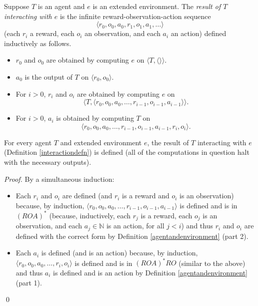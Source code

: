 \documentclass[runningheads]{llncs}
\begin{document}
\begin{definition}
\label{interactiondefn}
    Suppose $T$ is an agent and $e$ is an extended environment.
    The \emph{result of $T$ interacting with $e$} is the infinite
    reward-observation-action sequence
    \[\langle r_0,o_0,a_0,r_1,o_1,a_1,\ldots\rangle\]
    (each $r_i$ a reward, each $o_i$ an observation, and each $a_i$ an action)
    defined inductively as follows.
    \begin{itemize}
        \item $r_0$ and $o_0$ are obtained by computing $e$ on
        $\langle T,\langle\rangle\rangle$.
        \item $a_0$ is the output of $T$ on $\langle r_0,o_0\rangle$.
        \item For $i>0$, $r_i$ and $o_i$ are obtained by computing $e$
        on
        \[\langle T,\langle r_0,o_0,a_0,\ldots,r_{i-1},o_{i-1},a_{i-1}\rangle\rangle.\]
        \item For $i>0$, $a_i$ is obtained by computing $T$ on
        \[\langle r_0,o_0,a_0,\ldots,r_{i-1},o_{i-1},a_{i-1},r_i,o_i\rangle.\]
    \end{itemize}
\end{definition}

\begin{lemma}
    For every agent $T$ and extended environment $e$, the result of $T$ interacting
    with $e$ (Definition \ref{interactiondefn}) is defined (all of the computations
    in question halt with the necessary outputs).
\end{lemma}

\begin{proof}
    By a simultaneous induction:
    \begin{itemize}
        \item
        Each $r_i$ and $o_i$ are defined (and $r_i$ is a reward
        and $o_i$ is an observation) because, by induction,
        $\langle r_0,o_0,a_0,\ldots,r_{i-1},o_{i-1},a_{i-1}\rangle$
        is defined and is in $(ROA)^*$ (because, inductively,
        each $r_j$ is a reward, each $o_j$ is an observation,
        and each $a_j\in\mathbb N$ is an action, for all $j<i$)
        and thus $r_i$ and $o_i$ are defined with the correct form by
        Definition \ref{agentandenvironment} (part 2).
        \item
        Each $a_i$ is defined (and is an action) because, by induction,
        $\langle r_0,o_0,a_0,\ldots,r_i,o_i\rangle$
        is defined and is in $(ROA)^*RO$ (similar to the above) and thus
        $a_i$ is defined and is an action by Definition
        \ref{agentandenvironment} (part 1).
    \end{itemize}
    \qed
\end{proof}
\end{document}
